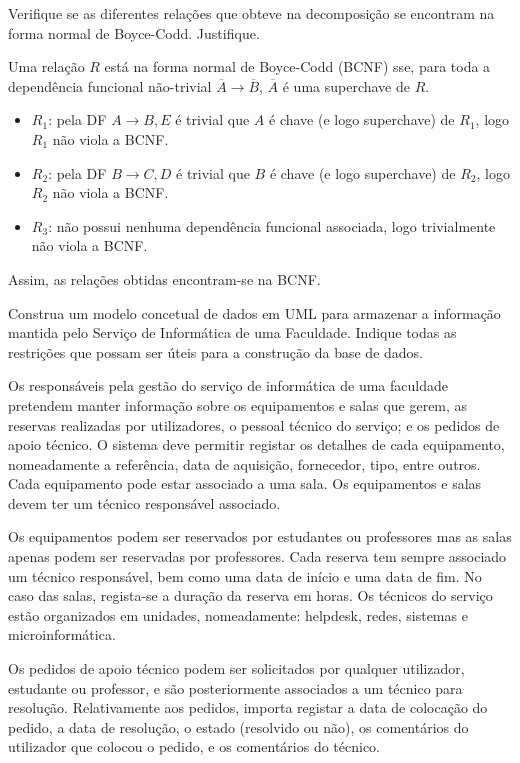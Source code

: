 \documentclass[type=normal, year=2014/15]{bdad_exam}
\begin{document}
{
Verifique se as diferentes relações que obteve na decomposição se encontram na forma normal de Boyce-Codd. Justifique.

\ansseparator

Uma relação $R$ está na forma normal de Boyce-Codd (BCNF) sse, para toda a dependência funcional não-trivial $\overline{A} \rightarrow \overline{B}$, $\overline{A}$ é uma superchave de $R$.
\begin{itemize}
    \item $R_1$: pela DF $A \rightarrow B, E$ é trivial que $A$ é chave (e logo superchave) de $R_1$, logo $R_1$ não viola a BCNF.
    \item $R_2$: pela DF $B \rightarrow C, D$ é trivial que $B$ é chave (e logo superchave) de $R_2$, logo $R_2$ não viola a BCNF.
    \item $R_3$: não possui nenhuma dependência funcional associada, logo trivialmente não viola a BCNF.
\end{itemize}
Assim, as relações obtidas encontram-se na BCNF.

Construa um modelo concetual de dados em UML para armazenar a informação mantida pelo Serviço de Informática de uma Faculdade. Indique todas as restrições que possam ser úteis para a construção da base de dados.

Os responsáveis pela gestão do serviço de informática de uma faculdade pretendem manter informação sobre os equipamentos e salas que gerem, as reservas realizadas por utilizadores, o pessoal técnico do serviço; e os pedidos de apoio técnico. O sistema deve permitir registar os detalhes de cada equipamento, nomeadamente a referência, data de aquisição, fornecedor, tipo, entre outros. Cada equipamento pode estar associado a uma sala. Os equipamentos e salas devem ter um técnico responsável associado.

Os equipamentos podem ser reservados por estudantes ou professores mas as salas apenas podem ser reservadas por professores. Cada reserva tem sempre associado um técnico responsável, bem como uma data de início e uma data de fim. No caso das salas, regista-se a duração da reserva em horas. Os técnicos do serviço estão organizados em unidades, nomeadamente: helpdesk, redes, sistemas e microinformática.

Os pedidos de apoio técnico podem ser solicitados por qualquer utilizador, estudante ou professor, e são posteriormente associados a um técnico para resolução. Relativamente aos pedidos, importa registar a data de colocação do pedido, a data de resolução, o estado (resolvido ou não), os comentários do utilizador que colocou o pedido, e os comentários do técnico.

}
\end{document}
